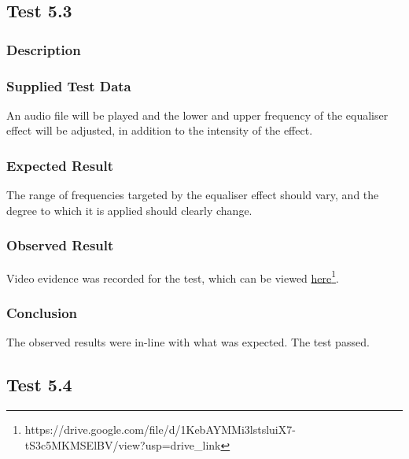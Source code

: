 \pagebreak
\subsection{Test 5.3}
\subsubsection{Description}
\paragraph{}
{
	\centering
}

\subsubsection{Supplied Test Data}
An audio file will be played and the lower and upper frequency of the equaliser effect will be adjusted, in addition to the intensity of the effect.

\subsubsection{Expected Result}
The range of frequencies targeted by the equaliser effect should vary, and the degree to which it is applied should clearly change.

\subsubsection{Observed Result}
\label{sec:evidence5.3}
Video evidence was recorded for the test, which can be viewed \href{https://drive.google.com/file/d/1KebAYMMi3lstsluiX7-tS3c5MKMSElBV/view?usp=drive_link}{here}\footnote{
	https://drive.google.com/file/d/1KebAYMMi3lstsluiX7-tS3c5MKMSElBV/view?usp=drive\_link
}.

\subsubsection{Conclusion}
The observed results were in-line with what was expected. The test passed.


\pagebreak
\subsection{Test 5.4}
